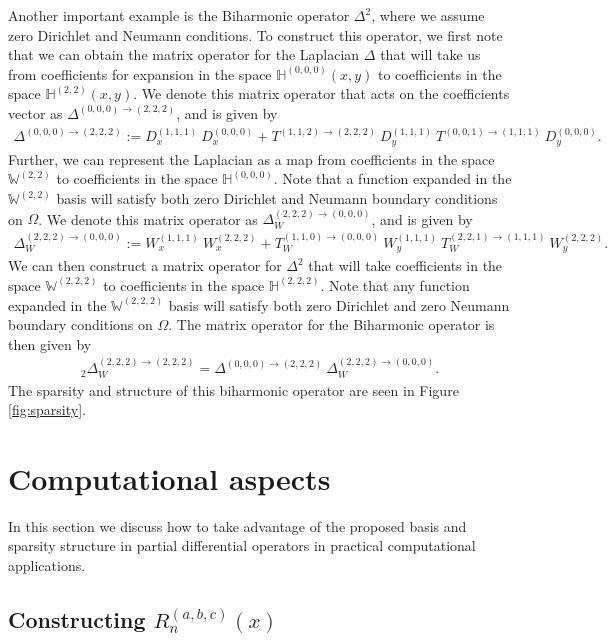 \documentclass[11pt, oneside]{article}   	%
\newcommand{\bstodo}{\todo[color=pink]}
\newcommand{\hdop}{H}
\newcommand{\bighdop}{\mathbb{\hdop}}
\newcommand{\genjac}{R}
\newcommand{\bigW}{\mathbb{W}}
\newcommand{\bighdopooo}{{\mathbb{\hdop}^{(0,0,0)}}}
\newcommand{\laplacewttt}{\Delta_W^{(2,2,2)\to(0,0,0)}}
\newcommand{\laplaceooo}{\Delta^{(0,0,0)\to(2,2,2)}}
\newcommand{\biharmonictwo}{_2\Delta_W^{(2,2,2)\to(2,2,2)}}
\begin{document}
Another important example is the Biharmonic operator $\Delta^2$, where we assume zero Dirichlet and Neumann conditions. To construct this operator, we first note that we can obtain the matrix operator for the Laplacian $\Delta$ that will take us from coefficients for expansion in the space $\bighdopooo(x,y)$ to coefficients in the space $\bighdop^{(2,2)}(x,y)$. We denote this matrix operator that acts on the coefficients vector as $\laplaceooo$, and is given by
\begin{align*}
    \laplaceooo := D_x^{(1,1,1)} \: D_x^{(0,0,0)} + T^{(1,1,2)\to(2,2,2)} \: D_y^{(1,1,1)} \: T^{(0,0,1)\to(1,1,1)} \: D_y^{(0,0,0)}.
\end{align*}
Further, we can represent the Laplacian as a map from coefficients in the space $\bigW^{(2,2)}$ to coefficients in the space $\bighdopooo$. Note that a function expanded in the $\bigW^{(2,2)}$ basis will satisfy both zero Dirichlet and Neumann boundary conditions on $\Omega$. We denote this matrix operator as $\laplacewttt$, and is given by
\begin{align*}
	\laplacewttt := W_x^{(1,1,1)} \: W_x^{(2,2,2)} + T_W^{(1,1,0)\to(0,0,0)} \: W_y^{(1,1,1)} \: T_W^{(2,2,1)\to(1,1,1)} \: W_y^{(2,2,2)}.
\end{align*}
We can then construct a matrix operator for $\Delta^2$ that will take coefficients in the space $\bigW^{(2,2,2)}$ to coefficients in the space $\bighdop^{(2,2,2)}$. Note that any function expanded in the $\bigW^{(2,2,2)}$ basis will satisfy both zero Dirichlet and zero Neumann boundary conditions on $\Omega$. The matrix operator for the Biharmonic operator is then given by
\begin{align*}
	\biharmonictwo = \laplaceooo \: \laplacewttt.
\end{align*}
The sparsity and structure of this biharmonic operator \bstodo{typo 4}are seen in Figure \ref{fig:sparsity}.



\section{Computational aspects}\label{Section:Computation}

In this section we discuss how to take advantage of the proposed basis and sparsity structure in partial differential operators in practical computational applications.

\subsection{Constructing $\genjac_n^{(a,b,c)}(x)$}
\end{document}
